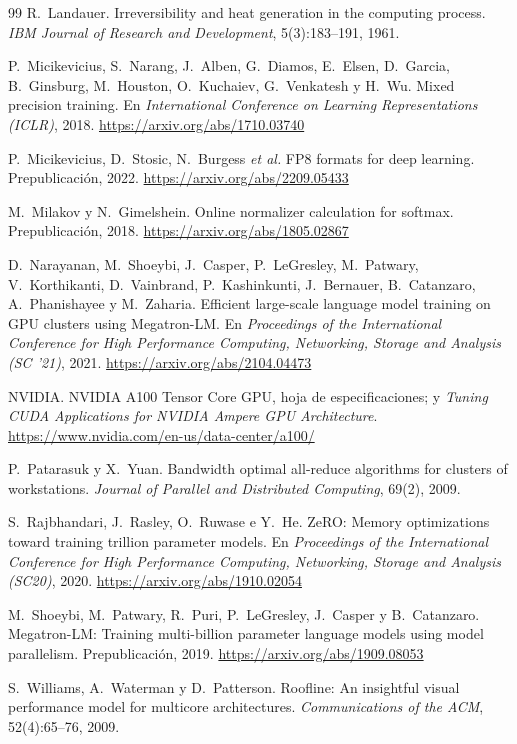 \begin{thebibliography}{99}
R.~Landauer.
\newblock Irreversibility and heat generation in the computing process.
\newblock \emph{IBM Journal of Research and Development}, 5(3):183--191, 1961.

P.~Micikevicius, S.~Narang, J.~Alben, G.~Diamos, E.~Elsen, D.~Garcia, B.~Ginsburg, M.~Houston, O.~Kuchaiev, G.~Venkatesh y H.~Wu.
\newblock Mixed precision training.
\newblock En \emph{International Conference on Learning Representations (ICLR)}, 2018.
\newblock \url{https://arxiv.org/abs/1710.03740}

P.~Micikevicius, D.~Stosic, N.~Burgess \emph{et al.}
\newblock FP8 formats for deep learning.
\newblock Prepublicación, 2022.
\newblock \url{https://arxiv.org/abs/2209.05433}

M.~Milakov y N.~Gimelshein.
\newblock Online normalizer calculation for softmax.
\newblock Prepublicación, 2018.
\newblock \url{https://arxiv.org/abs/1805.02867}

D.~Narayanan, M.~Shoeybi, J.~Casper, P.~LeGresley, M.~Patwary, V.~Korthikanti, D.~Vainbrand, P.~Kashinkunti, J.~Bernauer, B.~Catanzaro, A.~Phanishayee y M.~Zaharia.
\newblock Efficient large-scale language model training on GPU clusters using Megatron-LM.
\newblock En \emph{Proceedings of the International Conference for High Performance Computing, Networking, Storage and Analysis (SC '21)}, 2021.
\newblock \url{https://arxiv.org/abs/2104.04473}

NVIDIA.
\newblock NVIDIA A100 Tensor Core GPU, hoja de especificaciones; y \emph{Tuning CUDA Applications for NVIDIA Ampere GPU Architecture}.
\newblock \url{https://www.nvidia.com/en-us/data-center/a100/}

P.~Patarasuk y X.~Yuan.
\newblock Bandwidth optimal all-reduce algorithms for clusters of workstations.
\newblock \emph{Journal of Parallel and Distributed Computing}, 69(2), 2009.

S.~Rajbhandari, J.~Rasley, O.~Ruwase e Y.~He.
\newblock ZeRO: Memory optimizations toward training trillion parameter models.
\newblock En \emph{Proceedings of the International Conference for High Performance Computing, Networking, Storage and Analysis (SC20)}, 2020.
\newblock \url{https://arxiv.org/abs/1910.02054}

M.~Shoeybi, M.~Patwary, R.~Puri, P.~LeGresley, J.~Casper y B.~Catanzaro.
\newblock Megatron-LM: Training multi-billion parameter language models using model parallelism.
\newblock Prepublicación, 2019.
\newblock \url{https://arxiv.org/abs/1909.08053}

S.~Williams, A.~Waterman y D.~Patterson.
\newblock Roofline: An insightful visual performance model for multicore architectures.
\newblock \emph{Communications of the ACM}, 52(4):65--76, 2009.

\end{thebibliography}
